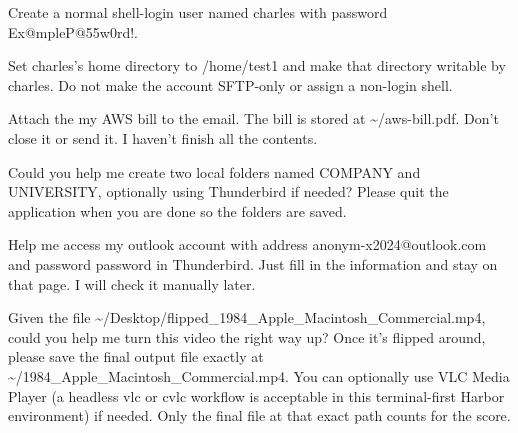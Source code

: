 \begin{instructionbox}
Create a normal shell-login user named \textasciigrave{}charles\textasciigrave{} with password \textasciigrave{}Ex@mpleP@55w0rd!\textasciigrave{}.

Set \textasciigrave{}charles\textasciigrave{}'s home directory to \textasciigrave{}/home/test1\textasciigrave{} and make that directory writable by \textasciigrave{}charles\textasciigrave{}. Do not make the account SFTP-only or assign a non-login shell.
\end{instructionbox}

\begin{instructionbox}
Attach the my AWS bill to the email. The bill is stored at \textasciigrave{}\textasciitilde{}/aws-bill.pdf\textasciigrave{}. Don't close it or send it. I haven't finish all the contents.
\end{instructionbox}

\begin{instructionbox}
Could you help me create two local folders named \textasciigrave{}COMPANY\textasciigrave{} and \textasciigrave{}UNIVERSITY\textasciigrave{}, optionally using Thunderbird if needed? Please quit the application when you are done so the folders are saved.
\end{instructionbox}

\begin{instructionbox}
Help me access my outlook account with address \textasciigrave{}anonym-x2024@outlook.com\textasciigrave{} and password \textasciigrave{}password\textasciigrave{} in Thunderbird. Just fill in the information and stay on that page. I will check it manually later.
\end{instructionbox}

\begin{instructionbox}
Given the file \textasciigrave{}\textasciitilde{}/Desktop/flipped\_1984\_Apple\_Macintosh\_Commercial.mp4\textasciigrave{}, could you help me turn this video the right way up? Once it's flipped around, please save the final output file exactly at \textasciigrave{}\textasciitilde{}/1984\_Apple\_Macintosh\_Commercial.mp4\textasciigrave{}. You can optionally use VLC Media Player (a headless \textasciigrave{}vlc\textasciigrave{} or \textasciigrave{}cvlc\textasciigrave{} workflow is acceptable in this terminal-first Harbor environment) if needed. Only the final file at that exact path counts for the score.
\end{instructionbox}

